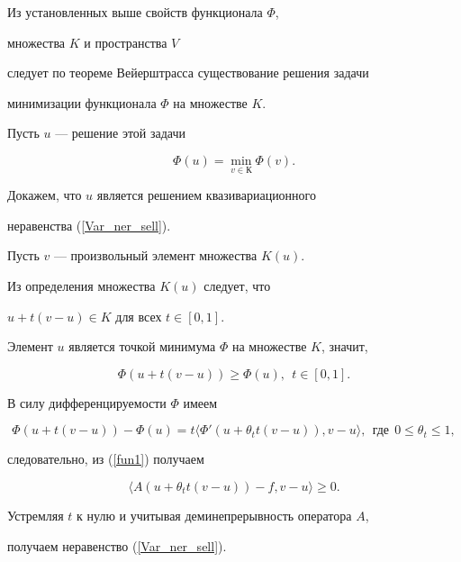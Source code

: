\begin{pf}
Из установленных выше свойств функционала $\Phi$, 


множества $K$ и пространства $V$ 


следует по теореме Вейерштрасса \cite{Van72} существование решения задачи


минимизации функционала $\Phi$ на множестве $K$.


Пусть $u$ --- решение этой задачи


$$


\Phi (u)=\min_{v \in К} \Phi (v) .


$$


Докажем, что $u$ является решением квазивариационного 


неравенства (\ref{Var_ner_sell}). 


Пусть $v$ --- произвольный элемент множества $K(u)$. 


Из определения множества $K(u)$ следует, что 


$u+t(v-u) \in K$ для всех $t \in [0,1]$.


Элемент $u$ является точкой минимума $\Phi$ на множестве $K$, значит, 


\begin{equation}


\Phi (u+t(v-u) ) \ge \Phi (u),\ \ t \in [0,1].


\label{fun1} 


\end{equation}


В силу дифференцируемости $\Phi$ имеем


$$


\Phi(u+t(v-u))-\Phi (u)=t\langle{{\Phi}'(u+\theta_t t (v-u) ), v-u}\rangle,


\ \ \text{где}\ \ 0 \le \theta _t \le 1,


$$


следовательно, из (\ref{fun1}) получаем


$$


\langle {A(u+\theta _t t (v-u)) - f, v-u} \rangle \ge 0.


$$


Устремляя $t$ к нулю и учитывая деминепрерывность оператора $A$,


получаем неравенство (\ref{Var_ner_sell}).


\end{pf}





